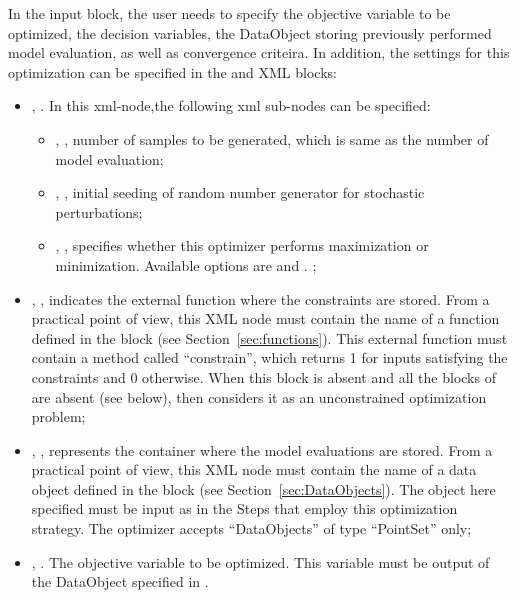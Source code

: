 In the  input block, the user needs to specify the objective variable to be optimized, the decision variables, the DataObject storing previously performed model evaluation, as well as convergence criteira. In addition, the settings for this optimization can be specified in the  and  XML blocks:
\begin{itemize}
\item {},  . In this xml-node,the following xml sub-nodes can be specified:
  \begin{itemize}
    \item {}, , number of samples to be generated, which is same as the number of model evaluation;
    \item {}, , initial seeding of random number generator for stochastic perturbations;
    \item {},  , specifies whether this optimizer performs maximization or minimization. Available options are  and .
    ;
  \end{itemize}
\end{itemize}
\begin{itemize}
\item {}, ,
        indicates the external function where the constraints are stored. From a practical point of view, this XML node must contain the name of
        a function defined in the  block (see Section~\ref{sec:functions}). This external function must contain a method called ``constrain'', which returns 1 for inputs satisfying the constraints and 0 otherwise. When this block is absent and all the  blocks of  are absent (see below), then  considers it as an unconstrained optimization problem;
\item {}, ,
        represents the container where the model evaluations are stored.
        From a practical point of view, this XML node must contain the name of
        a data object defined in the  block (see
        Section~\ref{sec:DataObjects}). The object here specified must be
        input as   in the Steps that employ this optimization strategy.
        The  optimizer accepts ``DataObjects'' of type ``PointSet'' only;
\item {}, . The objective variable to be optimized. This variable must be output of the DataObject specified in .
\end{itemize}
